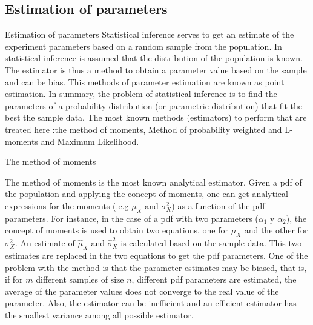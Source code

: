 \documentclass[8pt]{beamer}
\renewcommand{\emph}[1]{\textcolor{myorange}{#1}}
\begin{document}
\subsection{Estimation of parameters} %
\begin{frame}{Estimation of parameters}
    \alert{Statistical inference} serves to get an \emph{estimate of the experiment parameters} based on a \emph{random sample} from the population. In statistical inference is assumed that the distribution of the population is known. The \alert{estimator} is thus a method to obtain a parameter value based on the sample and can be \emph{bias}. This methods of parameter estimation are known as \alert{point estimation}. In summary, the problem of statistical inference is to find the parameters of a probability distribution (or parametric distribution) that fit the best the sample data. The most known methods (estimators) to perform that are treated here :\emph{the method of moments}, \emph{Method of probability weighted and L-moments} and \emph{Maximum Likelihood}.

    \begin{block}{The method of moments}

        The \alert{method of moments} is the most known analytical estimator. Given a \emph{pdf} of the population and applying the concept of moments, one can get analytical expressions for the moments (.e.g $\mu_X$ and $\sigma_X^2$) as a function of the  \emph{pdf parameters}. For instance, in the case of a \emph{pdf} with two parameters ($\alpha_1$ y $\alpha_2$), the concept of moments is used to obtain two equations, one for $\mu_X$ and the other for $\sigma_X^2$. An   \emph{estimate} of $\hat{\mu}_X$ and $\hat{\sigma}_X^2$ is calculated based on the  \emph{sample data}. This two estimates are replaced in the two equations to get the \emph{pdf parameters}. One of the problem with the method is that the parameter estimates may be biased, that is, if for $m$ different samples of size $n$, different \emph{pdf parameters} are estimated, the average of the parameter values does not converge to the real value of the parameter. Also, the estimator can be \emph{inefficient} and an \emph{efficient estimator} has the smallest variance among all possible estimator.  

    \end{block}
\end{frame}
\end{document}
